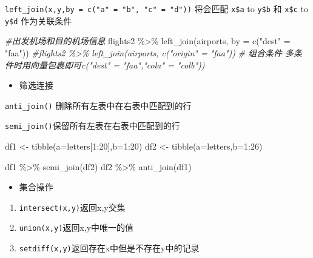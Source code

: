 \documentclass[
]{book}
\newenvironment{Shaded}{\begin{snugshade}}{\end{snugshade}}
\newcommand{\AttributeTok}[1]{\textcolor[rgb]{0.77,0.63,0.00}{#1}}
\newcommand{\CommentTok}[1]{\textcolor[rgb]{0.56,0.35,0.01}{\textit{#1}}}
\newcommand{\DecValTok}[1]{\textcolor[rgb]{0.00,0.00,0.81}{#1}}
\newcommand{\FunctionTok}[1]{\textcolor[rgb]{0.00,0.00,0.00}{#1}}
\newcommand{\NormalTok}[1]{#1}
\newcommand{\OtherTok}[1]{\textcolor[rgb]{0.56,0.35,0.01}{#1}}
\newcommand{\SpecialCharTok}[1]{\textcolor[rgb]{0.00,0.00,0.00}{#1}}
\newcommand{\StringTok}[1]{\textcolor[rgb]{0.31,0.60,0.02}{#1}}
\providecommand{\tightlist}{%
  \setlength{\itemsep}{0pt}\setlength{\parskip}{0pt}}
\begin{document}
\texttt{left\_join(x,y,by\ =\ c("a"\ =\ "b",\ "c"\ =\ "d"))} 将会匹配 \texttt{x\$a} to \texttt{y\$b} 和 \texttt{x\$c} to \texttt{y\$d} 作为关联条件

\begin{Shaded}
\begin{Highlighting}[]
\CommentTok{\#出发机场和目的机场信息}
\NormalTok{flights2 }\SpecialCharTok{\%\textgreater{}\%} \FunctionTok{left\_join}\NormalTok{(airports, }\AttributeTok{by =} \FunctionTok{c}\NormalTok{(}\StringTok{"dest"} \OtherTok{=} \StringTok{"faa"}\NormalTok{))}
\CommentTok{\#flights2 \%\textgreater{}\% left\_join(airports, c("origin" = "faa"))}
\CommentTok{\# 组合条件 多条件时用向量包裹即可c("dest" = "faa","cola" = "colb"))}
\end{Highlighting}
\end{Shaded}

\begin{itemize}
\tightlist
\item
  筛选连接
\end{itemize}

\texttt{anti\_join()} 删除所有左表中在右表中匹配到的行

\texttt{semi\_join()}保留所有左表在右表中匹配到的行

\begin{Shaded}
\begin{Highlighting}[]
\NormalTok{df1 }\OtherTok{\textless{}{-}} \FunctionTok{tibble}\NormalTok{(}\AttributeTok{a=}\NormalTok{letters[}\DecValTok{1}\SpecialCharTok{:}\DecValTok{20}\NormalTok{],}\AttributeTok{b=}\DecValTok{1}\SpecialCharTok{:}\DecValTok{20}\NormalTok{)}
\NormalTok{df2 }\OtherTok{\textless{}{-}} \FunctionTok{tibble}\NormalTok{(}\AttributeTok{a=}\NormalTok{letters,}\AttributeTok{b=}\DecValTok{1}\SpecialCharTok{:}\DecValTok{26}\NormalTok{)}

\NormalTok{df1 }\SpecialCharTok{\%\textgreater{}\%} \FunctionTok{semi\_join}\NormalTok{(df2)}
\NormalTok{df2 }\SpecialCharTok{\%\textgreater{}\%} \FunctionTok{anti\_join}\NormalTok{(df1)}
\end{Highlighting}
\end{Shaded}

\begin{itemize}
\tightlist
\item
  集合操作
\end{itemize}

\begin{enumerate}
\def\labelenumi{\arabic{enumi}.}
\item
  \texttt{intersect(x,y)}返回x,y交集
\item
  \texttt{union(x,y)}返回x,y中唯一的值
\item
  \texttt{setdiff(x,y)}返回存在x中但是不存在y中的记录
\end{enumerate}
\end{document}
